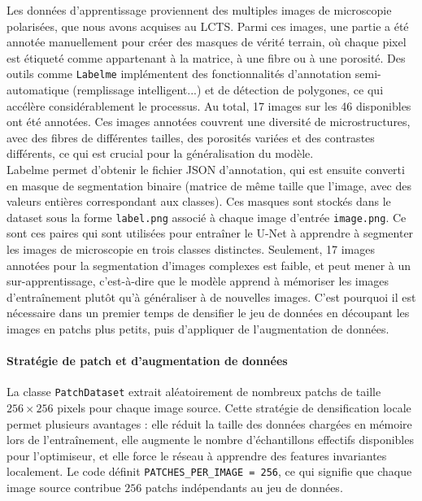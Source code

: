 \documentclass[a4paper,11pt]{article}
\begin{document}
Les données d'apprentissage proviennent des multiples images de microscopie polarisées, que nous avons acquises au LCTS. Parmi ces images, une partie a été annotée manuellement pour créer des masques de vérité terrain, où chaque pixel est étiqueté comme appartenant à la matrice, à une fibre ou à une porosité. Des outils comme \texttt{Labelme} implémentent des fonctionnalités d'annotation semi-automatique (remplissage intelligent...) et de détection de polygones, ce qui accélère considérablement le processus. Au total, 17 images sur les 46 disponibles ont été annotées. Ces images annotées couvrent une diversité de microstructures, avec des fibres de différentes tailles, des porosités variées et des contrastes différents, ce qui est crucial pour la généralisation du modèle. \\


Labelme permet d'obtenir le fichier JSON d'annotation, qui est ensuite converti en masque de segmentation binaire (matrice de même taille que l'image, avec des valeurs entières correspondant aux classes). Ces masques sont stockés dans le dataset sous la forme \texttt{label.png} associé à chaque image d'entrée \texttt{image.png}. Ce sont ces paires qui sont utilisées pour entraîner le U-Net à apprendre à segmenter les images de microscopie en trois classes distinctes. Seulement, 17 images annotées pour la segmentation d'images complexes est faible, et peut mener à un sur-apprentissage, c'est-à-dire que le modèle apprend à mémoriser les images d'entraînement plutôt qu'à généraliser à de nouvelles images. C'est pourquoi il est nécessaire dans un premier temps de densifier le jeu de données en découpant les images en patchs plus petits, puis d'appliquer de l'augmentation de données.

\paragraph{Stratégie de patch et d'augmentation de données}

La classe \texttt{PatchDataset} extrait aléatoirement de nombreux patchs de taille $256\times 256$ pixels pour chaque image source. Cette stratégie de densification locale permet plusieurs avantages : elle réduit la taille des données chargées en mémoire lors de l'entraînement, elle augmente le nombre d'échantillons effectifs disponibles pour l'optimiseur, et elle force le réseau à apprendre des features invariantes localement. Le code définit \texttt{PATCHES\_PER\_IMAGE = 256}, ce qui signifie que chaque image source contribue $256$ patchs indépendants au jeu de données.
\end{document}
